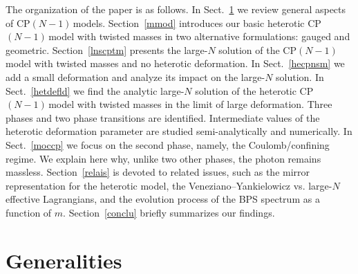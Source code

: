 \documentclass[epsfig,12pt]{article}
\newcommand{\cpn}{CP$(N-1)\,$}
\begin{document}
The organization of the paper is as follows. In Sect.~\ref{genera} we review general aspects of \cpn models.  
Section~\ref{mmod} introduces our basic heterotic \cpn model with twisted masses in two alternative formulations: gauged and geometric. Section~\ref{lnscptm} presents the large-$N$ solution of the \cpn model with twisted
masses and no heterotic deformation. In Sect.~\ref{hecpnsm} we add a small deformation and analyze its impact on the
 large-$N$ solution. In Sect.~\ref{hetdefld} we find the
 analytic  large-$N$ solution of the heterotic \cpn model with twisted
masses in the limit of large deformation. 
Three phases and two phase transitions are identified. Intermediate values of the heterotic deformation parameter
are studied semi-analytically and numerically.
In Sect.~\ref{moccp} we focus on the second
phase, namely, the Coulomb/confining regime. 
We explain here why, unlike two other phases, the photon remains massless.
Section~\ref{relais} is devoted to related issues, such as 
the mirror representation for the heterotic  model, the Veneziano--Yankielowicz vs. large-$N$ effective Lagrangians,
and the evolution process of the BPS spectrum as a function of $m$.
Section~\ref{conclu} briefly summarizes our findings.






\section{Generalities}
\label{genera}
\setcounter{equation}{0}
\end{document}
